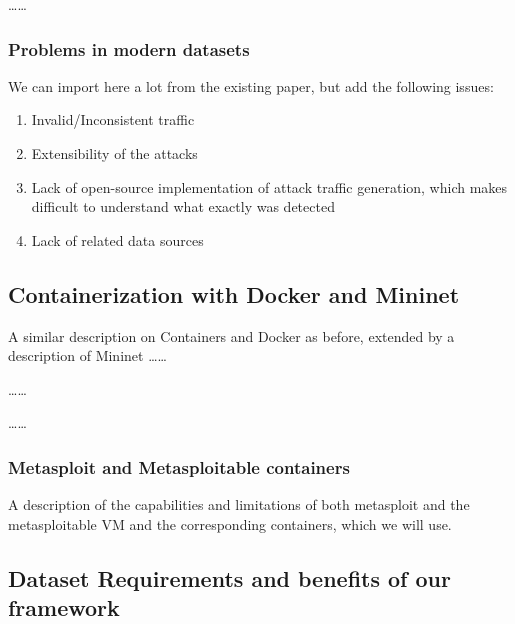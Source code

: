 \documentclass[sigconf]{acmart}
\begin{document}
\dots \dots

\subsubsection{Problems in modern datasets}\label{Sec:problems}

We can import here a lot from the existing paper, but add the following issues:
\begin{enumerate}
\item Invalid/Inconsistent traffic
\item Extensibility of the attacks
\item Lack of open-source implementation of attack traffic generation, which makes difficult to understand what exactly was detected
\item Lack of related data sources
\end{enumerate}


\subsection{Containerization with Docker and Mininet}

A similar description on Containers and Docker as before, extended by a description of Mininet
\dots \dots

\dots \dots

\dots \dots

\subsubsection{Metasploit and Metasploitable containers}

A description of the capabilities and limitations of both metasploit and the metasploitable VM and the corresponding containers, which we will use.






\subsection{Dataset Requirements and benefits of our framework}
\end{document}
